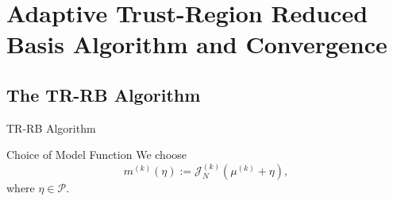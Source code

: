 \section{Adaptive Trust-Region Reduced Basis Algorithm and Convergence}

\subsection{The TR-RB Algorithm}

\begin{frame}{TR-RB Algorithm}
    \begin{block}{Choice of Model Function}
        We choose
        \begin{equation*}
            m^{(k)}(\eta) := \mathcal{J}_N^{(k)}(\mu^{(k)} + \eta),
        \end{equation*}
        where $\eta \in \mathcal{P}$. \\~\\

    \end{block}
\end{frame}

